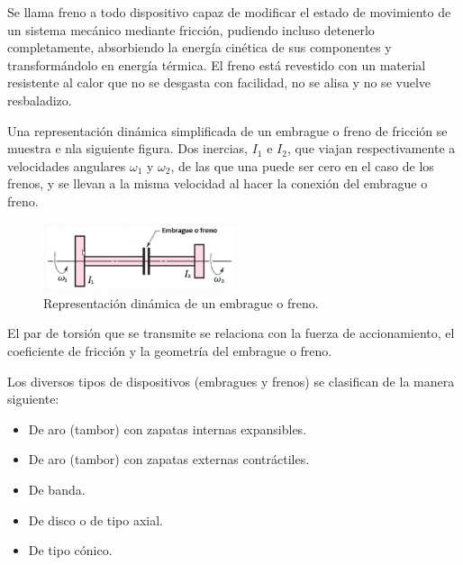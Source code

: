 \documentclass[12pt, letterpaper]{extarticle}
\begin{document}


\newpage

\tableofcontents

\newpage



Se llama freno a todo dispositivo capaz de modificar el estado de movimiento de un sistema mecánico mediante fricción, pudiendo incluso detenerlo completamente, absorbiendo la energía cinética de sus componentes y transformándolo en energía térmica. El freno está revestido con un material resistente al calor que no se desgasta con facilidad, no se alisa y no se vuelve resbaladizo.

Una representación dinámica simplificada de un embrague o freno de fricción se muestra e nla siguiente figura. Dos inercias, $I_{1}$ e $I_{2}$, que viajan respectivamente a velocidades angulares $\omega_{1}$ y $\omega_{2}$, de las que una puede ser cero en el caso de los frenos, y se llevan a la misma velocidad al hacer la conexión del embrague o freno.

\begin{figure}[h]
    \centering
    \includegraphics[width=0.5\textwidth]{Media/dinamica_simp_freno.png}
    \caption{Representación dinámica de un embrague o freno.}
    \label{Fig: Representacion dinamica de un embrague o freno}
\end{figure}

El par de torsión que se transmite se relaciona con la fuerza de accionamiento, el coeficiente de fricción y la geometría del embrague o freno.

Los diversos tipos de dispositivos (embragues y frenos) se clasifican de la manera siguiente:
\begin{itemize}
    \item De aro (tambor) con zapatas internas expansibles.
    \item De aro (tambor) con zapatas externas contráctiles.
    \item De banda.
    \item De disco o de tipo axial.
    \item De tipo cónico.
\end{itemize}
\end{document}
